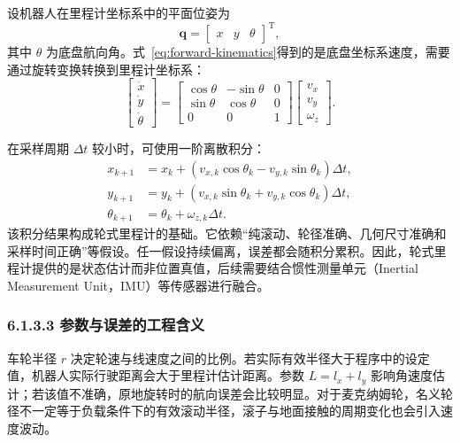 \documentclass[UTF8,zihao=-4]{ctexart}
\newcommand{\vect}[1]{\bm{#1}}
\begin{document}
设机器人在里程计坐标系中的平面位姿为
\begin{equation}
  \vect{q}=
  \begin{bmatrix}
    x & y & \theta
  \end{bmatrix}^{\mathrm T},
\end{equation}
其中 $\theta$ 为底盘航向角。式~\eqref{eq:forward-kinematics}得到的是底盘坐标系速度，需要通过旋转变换转换到里程计坐标系：
\begin{equation}
  \begin{bmatrix}
    \dot{x}\\
    \dot{y}\\
    \dot{\theta}
  \end{bmatrix}
  =
  \begin{bmatrix}
    \cos\theta & -\sin\theta & 0\\
    \sin\theta &  \cos\theta & 0\\
    0           &  0           & 1
  \end{bmatrix}
  \begin{bmatrix}
    v_x\\
    v_y\\
    \omega_z
  \end{bmatrix}.
  \label{eq:world-velocity}
\end{equation}

在采样周期 $\Delta t$ 较小时，可使用一阶离散积分：
\begin{align}
  x_{k+1} &= x_k + (v_{x,k}\cos\theta_k-v_{y,k}\sin\theta_k)\Delta t,\\
  y_{k+1} &= y_k + (v_{x,k}\sin\theta_k+v_{y,k}\cos\theta_k)\Delta t,\\
  \theta_{k+1} &= \theta_k + \omega_{z,k}\Delta t.
  \label{eq:odometry-integration}
\end{align}
该积分结果构成轮式里程计的基础。它依赖“纯滚动、轮径准确、几何尺寸准确和采样时间正确”等假设。任一假设持续偏离，误差都会随积分累积。因此，轮式里程计提供的是状态估计而非位置真值，后续需要结合惯性测量单元（Inertial Measurement Unit，IMU）等传感器进行融合。

\subsubsection*{6.1.3.3 参数与误差的工程含义}

车轮半径 $r$ 决定轮速与线速度之间的比例。若实际有效半径大于程序中的设定值，机器人实际行驶距离会大于里程计估计距离。参数 $L=l_x+l_y$ 影响角速度估计；若该值不准确，原地旋转时的航向误差会比较明显。对于麦克纳姆轮，名义轮径不一定等于负载条件下的有效滚动半径，滚子与地面接触的周期变化也会引入速度波动。
\end{document}
